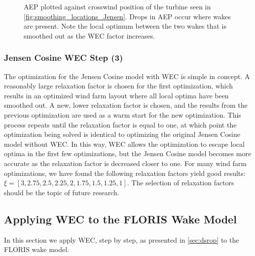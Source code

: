 \documentclass[a4paper]{jpconf}
\begin{document}
\begin{figure}[ht]
\begin{minipage}[t]{0.52\textwidth}
		\caption{AEP plotted against crosswind position of the turbine seen in \cref{fig:smoothing_locations_Jensen}. Drops in AEP occur where wakes are present. Note the local optimum between the two wakes that is smoothed out as the WEC factor increases.}
		\label{fig:JensenLocalOptSmoothed}
	\end{minipage}
\end{figure}

\subsubsection{Jensen Cosine WEC Step (3)}

The optimization for the Jensen Cosine model with WEC is simple in concept. A reasonably large relaxation factor is chosen for the first optimization, which results in an optimized wind farm layout where all local optima have been smoothed out. A new, lower relaxation factor is chosen, and the results from the previous optimization are used as a warm start for the new optimization. This process repeats until the relaxation factor is equal to one, at which point the optimization being solved is identical to optimizing the original Jensen Cosine model without WEC. In this way, WEC allows the optimization to escape local optima in the first few optimizations, but the Jensen Cosine model becomes more accurate as the relaxation factor is decreased closer to one. For many wind farm optimizations, we have found the following relaxation factors yield good results: $\xi = [3, 2.75, 2.5, 2.25, 2, 1.75, 1.5, 1.25, 1]$. The selection of relaxation factors should be the topic of future research.


\subsection{Applying WEC to the FLORIS Wake Model}
In this section we apply WEC, step by step, as presented in \cref{sec:dsrop} to the FLORIS wake model.  
\end{document}
